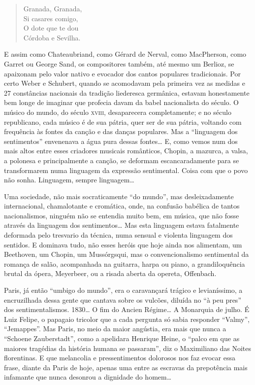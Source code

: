\begin{verse}
Granada, Granada,\\
Si casares comigo,\\
O dote que te dou\\
Córdoba e Sevilha.
\end{verse}

E assim como Chateaubriand, como Gérard de Nerval, como MacPherson, como
Garret ou George Sand, os compositores também, até mesmo um Berlioz, se
apaixonam pelo valor nativo e evocador dos cantos populares
tradicionais. Por certo Weber e Schubert, quando se acomodavam pela
primeira vez as medidas e 27 constâncias nacionais da tradição
liederesca germânica, estavam honestamente bem longe de imaginar que
profecia davam da babel nacionalista do século. O músico do mundo, do
século \textsc{xviii}, desaparecera completamente; e no século republicano, cada
músico é de sua pátria, quer ser de sua pátria, voltando com frequência
às fontes da canção e das danças populares. Mas a ``linguagem dos
sentimentos'' envenenava a água pura dessas fontes\ldots{} E, como vemos num
dos mais altos entre esses criadores musicais românticos, Chopin, a
mazurca, a valsa, a polonesa e principalmente a canção, se deformam
escancaradamente para se transformarem numa linguagem da expressão
sentimental. Coisa com que o povo não sonha. Linguagem, sempre
linguagem\ldots{}

Uma sociedade, não mais socraticamente ``do mundo'', mas desleixadamente
internacional, chamalotante e cromática, onde, na confusão babélica de
tantos nacionalismos, ninguém não se entendia muito bem, em música, que
não fosse através da linguagem dos sentimentos\ldots{} Mas esta linguagem
estava fatalmente deformada pelo tresvario da técnica, numa sensual e
violenta linguagem dos sentidos. E dominava tudo, não esses heróis que
hoje ainda nos alimentam, um Beethoven, um Chopin, um Mussórgsqui, mas o
convencionalismo sentimental da romança de salão, acompanhada na
guitarra, harpa ou piano, a grandiloquência brutal da ópera, Meyerbeer,
ou a risada aberta da opereta, Offenbach.

Paris, já então ``umbigo do mundo'', era o caravançará trágico e
levianíssimo, a encruzilhada dessa gente que cantava sobre os vulcões,
diluída no ``à peu pres'' dos sentimentalismos. 1830\ldots{} O fim do Ancien
Régime\ldots{} A Monarquia de julho. É Luiz Felipe, o papagaio tricolor que a
cada pergunta só sabia responder ``Valmy'', ``Jemappes''. Mas Paris, no
meio da maior angústia, era mais que nunca a ``Schoene Zauberstadt'',
como a apelidara Henrique Heine, o ``palco em que as maiores tragédias
da história humana se passaram'', diz o Maximiliano das Noites
florentinas. E que melancolia e pressentimentos dolorosos nos faz evocar
essa frase, diante da Paris de hoje, apenas uma entre as escravas da
prepotência mais infamante que nunca desonrou a dignidade do homem\ldots{}

